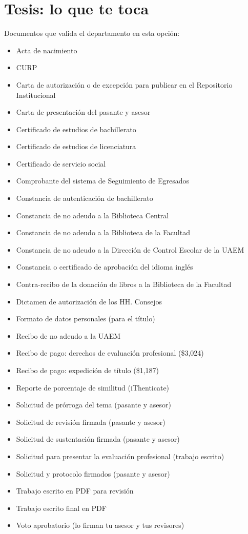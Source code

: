 \section{Tesis: lo que te toca}
Documentos que valida el departamento en esta opción:
\begin{itemize}
  \item Acta de nacimiento
  \item CURP
  \item Carta de autorización o de excepción para publicar en el Repositorio Institucional
  \item Carta de presentación del pasante y asesor
  \item Certificado de estudios de bachillerato
  \item Certificado de estudios de licenciatura
  \item Certificado de servicio social
  \item Comprobante del sistema de Seguimiento de Egresados
  \item Constancia de autenticación de bachillerato
  \item Constancia de no adeudo a la Biblioteca Central
  \item Constancia de no adeudo a la Biblioteca de la Facultad
  \item Constancia de no adeudo a la Dirección de Control Escolar de la UAEM
  \item Constancia o certificado de aprobación del idioma inglés
  \item Contra-recibo de la donación de libros a la Biblioteca de la Facultad
  \item Dictamen de autorización de los HH. Consejos
  \item Formato de datos personales (para el título)
  \item Recibo de no adeudo a la UAEM
  \item Recibo de pago: derechos de evaluación profesional (\$3,024)
  \item Recibo de pago: expedición de título (\$1,187)
  \item Reporte de porcentaje de similitud (iThenticate)
  \item Solicitud de prórroga del tema (pasante y asesor)
  \item Solicitud de revisión firmada (pasante y asesor)
  \item Solicitud de sustentación firmada (pasante y asesor)
  \item Solicitud para presentar la evaluación profesional (trabajo escrito)
  \item Solicitud y protocolo firmados (pasante y asesor)
  \item Trabajo escrito en PDF para revisión
  \item Trabajo escrito final en PDF
  \item Voto aprobatorio (lo firman tu asesor y tus revisores)
\end{itemize}
